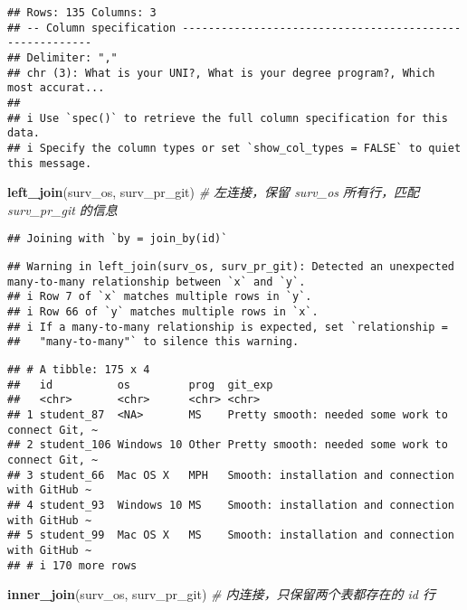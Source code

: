 \documentclass[
]{article}
\newenvironment{Shaded}{\begin{snugshade}}{\end{snugshade}}
\newcommand{\CommentTok}[1]{\textcolor[rgb]{0.56,0.35,0.01}{\textit{#1}}}
\newcommand{\FunctionTok}[1]{\textcolor[rgb]{0.13,0.29,0.53}{\textbf{#1}}}
\newcommand{\NormalTok}[1]{#1}
\begin{document}
\begin{verbatim}
## Rows: 135 Columns: 3
## -- Column specification --------------------------------------------------------
## Delimiter: ","
## chr (3): What is your UNI?, What is your degree program?, Which most accurat...
## 
## i Use `spec()` to retrieve the full column specification for this data.
## i Specify the column types or set `show_col_types = FALSE` to quiet this message.
\end{verbatim}

\begin{Shaded}
\begin{Highlighting}[]
\FunctionTok{left\_join}\NormalTok{(surv\_os, surv\_pr\_git)                                     }\CommentTok{\# 左连接，保留 surv\_os 所有行，匹配 surv\_pr\_git 的信息}
\end{Highlighting}
\end{Shaded}

\begin{verbatim}
## Joining with `by = join_by(id)`
\end{verbatim}

\begin{verbatim}
## Warning in left_join(surv_os, surv_pr_git): Detected an unexpected many-to-many relationship between `x` and `y`.
## i Row 7 of `x` matches multiple rows in `y`.
## i Row 66 of `y` matches multiple rows in `x`.
## i If a many-to-many relationship is expected, set `relationship =
##   "many-to-many"` to silence this warning.
\end{verbatim}

\begin{verbatim}
## # A tibble: 175 x 4
##   id          os         prog  git_exp                                          
##   <chr>       <chr>      <chr> <chr>                                            
## 1 student_87  <NA>       MS    Pretty smooth: needed some work to connect Git, ~
## 2 student_106 Windows 10 Other Pretty smooth: needed some work to connect Git, ~
## 3 student_66  Mac OS X   MPH   Smooth: installation and connection with GitHub ~
## 4 student_93  Windows 10 MS    Smooth: installation and connection with GitHub ~
## 5 student_99  Mac OS X   MS    Smooth: installation and connection with GitHub ~
## # i 170 more rows
\end{verbatim}

\begin{Shaded}
\begin{Highlighting}[]
\FunctionTok{inner\_join}\NormalTok{(surv\_os, surv\_pr\_git)                                    }\CommentTok{\# 内连接，只保留两个表都存在的 id 行}
\end{Highlighting}
\end{Shaded}
\end{document}
